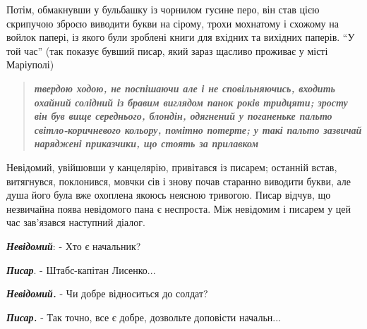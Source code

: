 \documentclass[a4paper,20pt]{report}
\begin{document}
Потім, обмакнувши у бульбашку із чорнилом гусине перо, він став цією скрипучою зброєю
виводити букви на сірому, трохи мохнатому і схожому на войлок папері, із якого були зроблені
книги для вхідних та вихідних паперів.
``У той час'' (так показує бувший писар, який зараз щасливо проживає у місті Маріуполі)
\begin{quote}
\bfseries\em
твердою ходою, не поспішаючи але і не сповільняючись, входить охайний солідний
із бравим виглядом панок років тридцяти; зросту він був вище
середнього, блондін, одягнений у поганеньке пальто світло-коричневого
кольору, помітно потерте; у такі пальто зазвичай наряджені приказчики,
що стоять за прилавком
\end{quote}

Невідомий, увійшовши у канцелярію, привітався із писарем; останній встав,
витягнувся, поклонився, мовчки сів і знову почав старанно виводити букви, але
душа його була вже охоплена якоюсь неясною тривогою.
Писар відчув, що незвичайна поява невідомого пана є неспроста.
Між невідомим і писарем у цей час зав'язався наступний діалог.

\textbf{\em Невідомий}: - Хто є начальник?

\textbf{\em Писар}. - Штабс-капітан Лисенко...

\textbf{\em Невідомий.} - Чи добре відноситься до солдат?

\textbf{\em Писар.} - Так точно, все є добре, дозвольте доповісти начальн...
\end{document}
